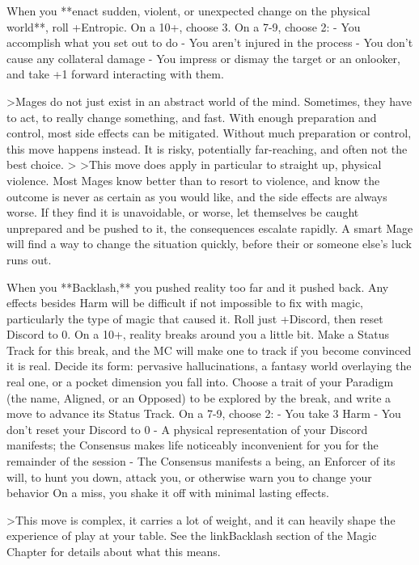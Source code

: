 \documentclass[
  oneside,
  statementpaper,
  9pt]{memoir}
\begin{document}
\begin{Player}
When you **enact sudden, violent, or unexpected change on the physical world**, roll +Entropic. On a 10+, choose 3. On a 7-9, choose 2:
- You accomplish what you set out to do
- You aren’t injured in the process
- You don’t cause any collateral damage
- You impress or dismay the target or an onlooker, and take +1 forward interacting with them.

>Mages do not just exist in an abstract world of the mind. Sometimes, they have to act, to really change something, and fast. With enough preparation and control, most side effects can be mitigated. Without much preparation or control, this move happens instead. It is risky, potentially far-reaching, and often not the best choice.
>
>This move does apply in particular to straight up, physical violence. Most Mages know better than to resort to violence, and know the outcome is never as certain as you would like, and the side effects are always worse. If they find it is unavoidable, or worse, let themselves be caught unprepared and be pushed to it, the consequences escalate rapidly. A smart Mage will find a way to change the situation quickly, before their or someone else’s luck runs out.

When you **Backlash,** you pushed reality too far and it pushed back. Any effects besides Harm will be difficult if not impossible to fix with magic, particularly the type of magic that caused it. Roll just +Discord, then reset Discord to 0. On a 10+, reality breaks around you a little bit. Make a Status Track for this break, and the MC will make one to track if you become convinced it is real. Decide its form: pervasive hallucinations, a fantasy world overlaying the real one, or a pocket dimension you fall into. Choose a trait of your Paradigm (the name, Aligned, or an Opposed) to be explored by the break, and write a move to advance its Status Track. 
On a 7-9, choose 2:
- You take 3 Harm
- You don’t reset your Discord to 0
- A physical representation of your Discord manifests; the Consensus makes life noticeably inconvenient for you for the remainder of the session
- The Consensus manifests a being, an Enforcer of its will, to hunt you down, attack you, or otherwise warn you to change your behavior 
On a miss, you shake it off with minimal lasting effects.

>This move is complex, it carries a lot of weight, and it can heavily shape the experience of play at your table. See the {{linkBacklash section}} of the Magic Chapter for details about what this means.

\end{Player}
\end{document}
